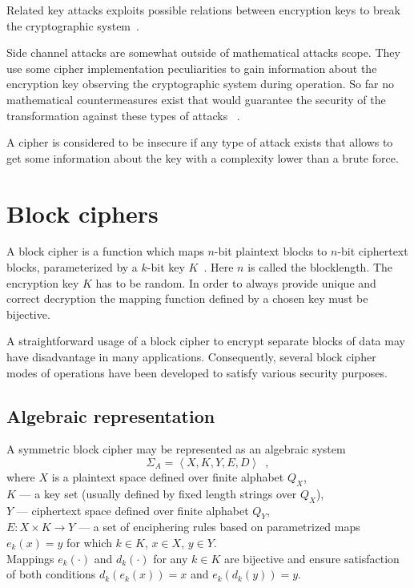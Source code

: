 Related key attacks exploits possible relations between encryption keys to
break the cryptographic system~\cite{StampLow:AppliedCryptanalysis}.

Side channel attacks are somewhat outside of mathematical attacks scope. They
use some cipher implementation peculiarities to gain information about the
encryption key observing the cryptographic system during operation. So far no
mathematical countermeasures exist that would guarantee the security of the
transformation against these types of attacks ~\cite{Quisquater:sidechannel}.

A cipher is considered to be insecure if any type of attack exists that allows
to get some information about the key with a complexity lower than a brute
force. 

\section{Block ciphers}

A block cipher is a function which maps $n$-bit plaintext blocks to $n$-bit 
ciphertext blocks, parameterized by a $k$-bit key
$K$~\cite{menezes:applied_cryptography}. Here $n$ is called the blocklength.
The encryption key $K$ has to be random. In order to always provide unique and
correct decryption the mapping function defined by a chosen key must be
bijective.

A straightforward usage of a block cipher to encrypt separate blocks of data may have
disadvantage in many applications. Consequently, several block cipher modes of
operations have been developed to satisfy various security purposes.

\subsection{Algebraic representation}
\label{sec:block-algebraic}

A symmetric block cipher may be represented as an algebraic
system~\cite{babash:cryptography}
\begin{equation}
\label{eqn:block-algebraic}
\Sigma_{A} = \left< X, K, Y, E, D \right> \enspace, 
\end{equation}
where $X$ is a plaintext space defined over finite alphabet $Q_X$, \\ 
$K$ --- a key set (usually defined by fixed length strings over $Q_X$), \\
$Y$ --- ciphertext space defined over finite alphabet $Q_Y$, \\
$E: X \times K \rightarrow Y$ --- a set of enciphering rules based on
parametrized maps $e_k(x) = y$ for which $k \in K$, $x \in X$, $y \in Y$. \\
Mappings $e_k(\cdot)$ and $d_k(\cdot)$ for any $k \in K$  are bijective and
ensure satisfaction of both conditions $d_k(e_k(x)) = x$ and $e_k(d_k(y)) = y$.

